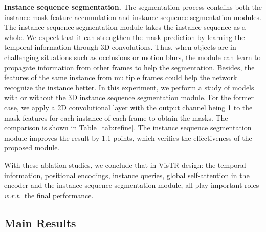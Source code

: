 \documentclass[final]{cvpr}
\def\Ours{{VisTR}\xspace}
\newcommand{\myparagraph}[1]{{\vspace{0.01cm} \noindent \bf #1}}
\begin{document}
{\myparagraph{Instance sequence segmentation.}
The segmentation process contains both the instance mask feature accumulation and instance sequence segmentation modules. The instance sequence segmentation module takes the instance sequence as a whole. We expect that it can strengthen the mask prediction by learning the temporal information through 3D convolutions. Thus, when objects are in challenging situations such as occlusions or motion blurs, the module can learn to propagate information from other frames to help the segmentation. Besides, the features of the same instance from multiple frames could help the network recognize the instance better. In this experiment, we perform a study of models with or without the 3D instance sequence segmentation module. For the former case, we apply a 2D convolutional layer with the output channel being 1 to the mask features for each instance of each frame to obtain the masks. The comparison is shown in Table~\ref{tab:refine}.
The instance sequence segmentation module improves the result by 1.1 points, which verifies the effectiveness of the proposed module. 


With
these ablation studies, we conclude that in 
\Ours design: the temporal information, positional encodings, instance queries, global self-attention in the encoder and the instance sequence segmentation module, 
all play important roles \textit{w.r.t.}\ the final performance. 



\subsection{Main Results}

}
\end{document}
